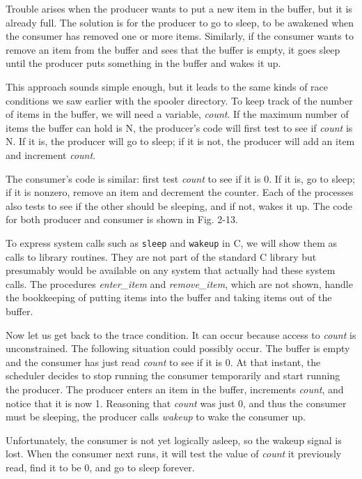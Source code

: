 \documentclass{book}
\newcommand {\sys} [1] {\textsl{#1}}
\newcommand {\cmd} [1] {\texttt{#1}}
\begin{document}
Trouble arises when the producer wants to put a new item in the buffer, but it is already full.
The solution is for the producer to go to sleep, to be awakened when the consumer has removed one or more items.
Similarly, if the consumer wants to remove an item from the buffer and sees that the buffer is empty,
it goes sleep until the producer puts something in the buffer and wakes it up.

This approach sounds simple enough, but it leads to the same kinds of race conditions we saw earlier with the spooler directory.
To keep track of the number of items in the buffer, we will need a variable, \sys{count}.
If the maximum number of items the buffer can hold is N, the producer's code will first test to see if \sys{count} is N. 
If it is, the producer will go to sleep; if it is not, the producer will add an item and increment \sys{count}.

The consumer's code is similar: first test \sys{count} to see if it is 0.
If it is, go to sleep; if it is nonzero, remove an item and decrement the counter.
Each of the processes also tests to see if the other should be sleeping, and if not, wakes it up.
The code for both producer and consumer is shown in Fig. 2-13.

To express system calls such as \cmd{sleep} and \cmd{wakeup} in C, we will show them as calls to library routines.
They are not part of the standard C library but presumably would be available on any system that actually had these system calls.
The procedures \sys{enter\_item} and \sys{remove\_item}, which are not shown,
handle the bookkeeping of putting items into the buffer and taking items out of the buffer.

Now let us get back to the trace condition.
It can occur because access to \sys{count} is unconstrained.
The following situation could possibly occur.
The buffer is empty and the consumer has just read \sys{count} to see if it is 0.
At that instant, the scheduler decides to stop running the consumer temporarily and start running the producer.
The producer enters an item in the buffer, increments \sys{count}, and notice that it is now 1.
Reasoning that \sys{count} was just 0, and thus the consumer must be sleeping, 
the producer calls \sys{wakeup} to wake the consumer up.

Unfortunately, the consumer is not yet logically asleep, so the wakeup signal is lost.
When the consumer next runs, it will test the value of \sys{count} it previously read, find it to be 0, and go to sleep forever.
\end{document}
